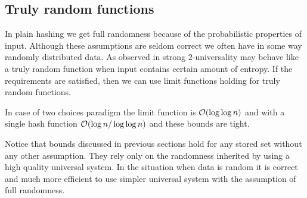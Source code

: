 \subsection{Truly random functions}
\label{subsection-truly-random-functions}
In plain hashing we get full randomness because of the probabilistic properties of input. Although these assumptions are seldom correct we often have in some way randomly distributed data. As observed in \cite{DBLP:conf/soda/MitzenmacherV08} strong $2$-universality may behave like a truly random function when input contains certain amount of entropy. If the requirements are satisfied, then we can use limit functions holding for truly random functions.

In case of two choices paradigm the limit function is $\mathcal{O}(\log \log n)$ and with a single hash function $\mathcal{O}(\log n / \log \log n)$ and these bounds are tight.

Notice that bounds discussed in previous sections hold for any stored set without any other assumption. They rely only on the randomness inherited by using a high quality universal system. In the situation when data is random it is correct and much more efficient to use simpler universal system with the assumption of full randomness.
